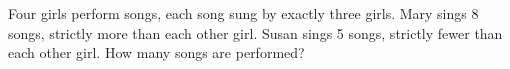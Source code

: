 Four girls perform songs, each song sung by exactly three girls. Mary sings 8 songs, strictly more than each other girl. Susan sings 5 songs, strictly fewer than each other girl. How many songs are performed?
